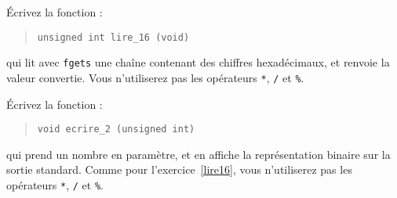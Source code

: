 Écrivez la fonction :
\begin {quote}
    \verb:unsigned int lire_16 (void):
\end {quote}
qui lit avec
{\tt fgets} une chaîne contenant des chiffres hexadécimaux, et renvoie la
valeur convertie.
Vous n'utiliserez pas les opérateurs \verb:*:, \verb:/:  et \verb:%:.


\question

Écrivez la fonction :
\begin {quote}
    \verb:void ecrire_2 (unsigned int):
\end {quote}
qui prend un
nombre en paramètre, et en affiche la représentation binaire sur la
sortie standard.
Comme pour l'exercice~\ref {lire16}, vous n'utiliserez pas les opérateurs
\verb:*:, \verb:/:  et \verb:%:.


